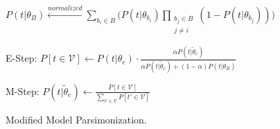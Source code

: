 \begin{algorithm}[t!]
\algfontsize
\begin{algorithmic}[1]
     \State \begin{small}$P(t|\theta_B) \xleftarrow{normalized} \sum_{b_i\in B} \bigg(P(t|\theta_{b_i}) \prod_{\substack{b_j\in B \\ j \neq i}} (1-P(t|\theta_{b_j}))\bigg)$ \end{small}
     \Repeat
         \State \begin{small}E-Step: $P[t\in \mathcal{V}] \gets P(t|\theta_e)\cdot \frac{\alpha P(t|\tilde{\theta}_e)}{\alpha P(t|\tilde{\theta}_e) + (1-\alpha) P(t|\theta_B)}$ \end{small}
          \State \begin{small}M-Step: $P(t|\tilde{\theta}_e) \gets \frac{ P[t \in \mathcal{V}]}{\sum_{t' \in \mathcal{V}} P[t' \in \mathcal{V}]}$ \end{small}
 \EndFor
 \EndProcedure
 \end{algorithmic}
 \caption{\label{alg:model_parsimonization}Modified Model Parsimonization.}
\end{algorithm}
